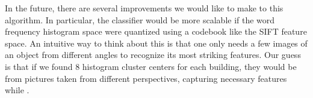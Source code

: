 In the future, there are several improvements we would like to make to this algorithm. 
In particular, the classifier would be more scalable if the word frequency histogram space were quantized using a codebook like the SIFT feature space. 
An intuitive way to think about this is that one only needs a few images of an object from different angles to recognize its most striking features.
Our guess is that if we found 8 histogram cluster centers for each building, they would be from pictures taken from different perspectives, capturing necessary features while .



